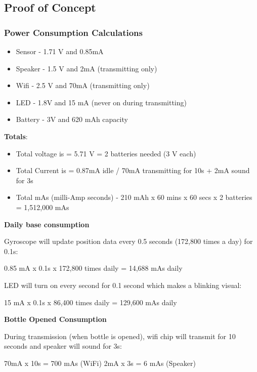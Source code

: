 \documentclass[12pt]{article}
\begin{document}
		\subsection*{Proof of Concept}
		\subsubsection*{Power Consumption Calculations}
		\begin{itemize}
			\item Sensor - 1.71 V and 0.85mA
			\item Speaker - 1.5 V and 2mA (transmitting only)
			\item Wifi - 2.5 V and 70mA (transmitting only)
			\item LED - 1.8V and 15 mA (never on during transmitting)
			\item Battery - 3V and 620 mAh capacity
		\end{itemize}

		\textbf{Totals}:
		\begin{itemize}
			\item Total voltage is = 5.71 V = 2 batteries needed (3 V each)
			\item Total Current is = 0.87mA idle / 70mA transmitting for 10s + 2mA sound for 3s
			\item Total mAs (milli-Amp seconds) - 210 mAh x 60 mins x 60 secs x 2 batteries = 1,512,000 mAs 
		\end{itemize}

		
		\textbf{Daily base consumption}
		
		Gyroscope will update position data every 0.5 seconds (172,800 times a day) for 0.1s:
		\begin{center}
			0.85 mA x 0.1s x 172,800 times daily = 14,688 mAs daily
		\end{center}
		
		LED will turn on every second for 0.1 second which makes a blinking visual:
		\begin{center}
			15 mA x 0.1s x 86,400 times daily = 129,600 mAs daily
		\end{center}
		
		\textbf{Bottle Opened Consumption}
		
		During transmission (when bottle is opened), wifi chip will transmit for 10 seconds and speaker will sound for 3s:
		\begin{center}
			70mA x 10s = 700 mAs (WiFi)
		2mA x 3s = 6 mAs (Speaker)
		\end{center}
	
\end{document}
